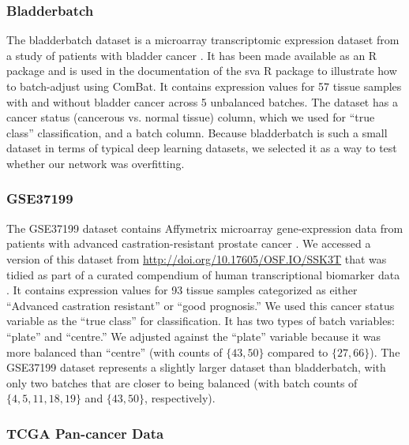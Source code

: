 \documentclass[11pt]{article}
\begin{document}
\subsubsection{Bladderbatch}

The bladderbatch dataset is a microarray transcriptomic expression dataset from a study of patients with bladder cancer \cite{dyrskjot_gene_2004}.
It has been made available as an R package \cite{leek_bladderbatch_2017} and is used in the documentation of the sva R package \cite{leek_sva_2017} to illustrate how to batch-adjust using ComBat.
It contains expression values for 57 tissue samples with and without bladder cancer across 5 unbalanced batches.
The dataset has a cancer status (cancerous vs. normal tissue) column, which we used for ``true class'' classification, and a batch column.
Because bladderbatch is such a small dataset in terms of typical deep learning datasets, we selected it as a way to test whether our network was overfitting.

\subsubsection{GSE37199}

The GSE37199 dataset contains Affymetrix microarray gene-expression data from patients with advanced castration-resistant prostate cancer \cite{olmos_prognostic_2012}.
We accessed a version of this dataset from \url{http://doi.org/10.17605/OSF.IO/SSK3T} that was tidied as part of a curated compendium of human transcriptional biomarker data \cite{golightly_curated_2018}.
It contains expression values for 93 tissue samples categorized as either ``Advanced castration resistant'' or ``good prognosis.''
We used this cancer status variable as the ``true class'' for classification.
It has two types of batch variables: ``plate'' and ``centre.''
We adjusted against the ``plate'' variable because it was more balanced than ``centre'' (with counts of $\{43, 50\}$ compared to $\{27, 66\}$).
The GSE37199 dataset represents a slightly larger dataset than bladderbatch, with only two batches that are closer to being balanced (with batch counts of $\{4, 5, 11, 18, 19\}$ and $\{43, 50\}$, respectively).

\subsubsection{TCGA Pan-cancer Data}
\end{document}
